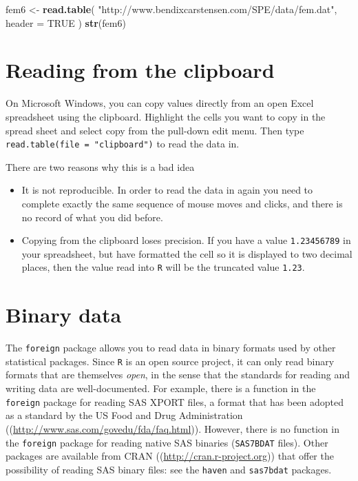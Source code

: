 \documentclass[
]{book}
\newenvironment{Shaded}{\begin{snugshade}}{\end{snugshade}}
\newcommand{\AttributeTok}[1]{\textcolor[rgb]{0.13,0.29,0.53}{#1}}
\newcommand{\ConstantTok}[1]{\textcolor[rgb]{0.56,0.35,0.01}{#1}}
\newcommand{\FunctionTok}[1]{\textcolor[rgb]{0.13,0.29,0.53}{\textbf{#1}}}
\newcommand{\NormalTok}[1]{#1}
\newcommand{\OtherTok}[1]{\textcolor[rgb]{0.56,0.35,0.01}{#1}}
\newcommand{\StringTok}[1]{\textcolor[rgb]{0.31,0.60,0.02}{#1}}
\providecommand{\tightlist}{%
  \setlength{\itemsep}{0pt}\setlength{\parskip}{0pt}}
\begin{document}
\begin{Shaded}
\begin{Highlighting}[]
\NormalTok{fem6 }\OtherTok{\textless{}{-}} 
  \FunctionTok{read.table}\NormalTok{(}
    \StringTok{"http://www.bendixcarstensen.com/SPE/data/fem.dat"}\NormalTok{,}
    \AttributeTok{header =} \ConstantTok{TRUE}
\NormalTok{  )}
\FunctionTok{str}\NormalTok{(fem6)}
\end{Highlighting}
\end{Shaded}

\section{Reading from the clipboard}\label{reading-from-the-clipboard}

On Microsoft Windows, you can copy values directly from an open Excel
spreadsheet using the clipboard. Highlight the cells you want to copy
in the spread sheet and select copy from the pull-down edit menu. Then
type \texttt{read.table(file\ =\ "clipboard")} to read the data in.

There are two reasons why this is a bad idea

\begin{itemize}
\tightlist
\item
  It is not reproducible. In order to read the data in again you
  need to complete exactly the same sequence of mouse moves and clicks,
  and there is no record of what you did before.
\item
  Copying from the clipboard loses precision. If you have a value
  \texttt{1.23456789} in your spreadsheet, but have formatted the cell so it
  is displayed to two decimal places, then the value read into
  \texttt{R} will be the truncated value \texttt{1.23}.
\end{itemize}

\section{Binary data}\label{binary-data}

The \texttt{foreign} package allows you to read data in binary formats
used by other statistical packages. Since \texttt{R} is an open source
project, it can only read binary formats that are themselves \emph{open},
in the sense that the standards for reading and writing data are
well-documented. For example, there is a function in the
\texttt{foreign} package for reading SAS XPORT files, a format that
has been adopted as a standard by the US Food and Drug Administration
((\url{http://www.sas.com/govedu/fda/faq.html})). However, there is no
function in the \texttt{foreign} package for reading native SAS
binaries (\texttt{SAS7BDAT} files). Other packages are available from
CRAN ((\url{http://cran.r-project.org})) that offer the possibility of
reading SAS binary files: see the \texttt{haven} and \texttt{sas7bdat}
packages.
\end{document}
